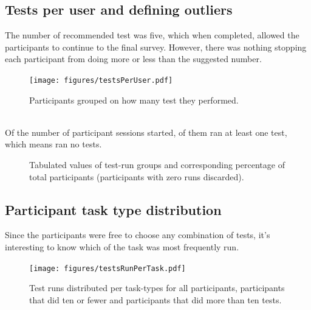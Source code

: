 \documentclass[nofilelist,dvipsnames]{cslthse-msc}
\begin{document}
			\subsection{Tests per user and defining outliers}

				The number of recommended test was five, which when completed, allowed
				the participants to continue to the final survey. However, there was
				nothing stopping each participant from doing more or less than the
				suggested number.

				\begin{figure}[h!]
					\centering
					\texttt{[image: figures/testsPerUser.pdf]}
					\caption{Participants grouped on how many test they performed.}
				\end{figure}

        \ \\
        Of the  number of participant sessions started,
        of them ran at least one test, which means  ran
        no tests.

        \begin{figure}
          \centering
          \caption{Tabulated values of test-run groups and corresponding
            percentage of total participants (participants with zero runs
            discarded).}
        \end{figure}

      \subsection{Participant task type distribution}

        Since the participants were free to choose any combination of tests,
        it's interesting to know which of the task was most frequently run.

				\begin{figure}[h!]
					\centering
					\texttt{[image: figures/testsRunPerTask.pdf]}
          \caption{
            Test runs distributed per task-types for all participants,
            participants that did ten or fewer and participants that did more
            than ten tests.
          }
				\end{figure}
\end{document}
